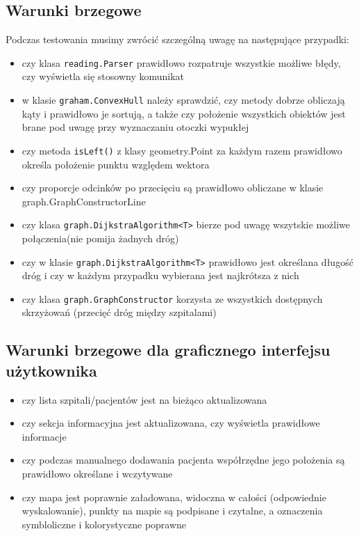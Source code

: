 \documentclass{article}
\begin{document}
\subsection{Warunki brzegowe}
Podczas testowania musimy zwrócić szczególną uwagę na następujące przypadki:

\begin{itemize}
    \item czy klasa \texttt{reading.Parser} prawidłowo rozpatruje wszystkie możliwe błędy, czy wyświetla się stosowny komunikat
    \item w klasie \texttt{graham.ConvexHull} należy sprawdzić, czy metody dobrze obliczają kąty i prawidłowo je sortują, a także czy położenie wszystkich obiektów jest brane pod uwagę przy wyznaczaniu otoczki wypukłej
    \item  czy metoda \texttt{isLeft()} z klasy geometry.Point za każdym razem prawidłowo określa położenie punktu względem wektora
    \item czy proporcje odcinków po przecięciu są prawidłowo obliczane w klasie graph.GraphConstructorLine
     \item czy klasa \texttt{graph.DijkstraAlgorithm<T>} bierze pod uwagę wszytskie możliwe połączenia(nie pomija żadnych dróg)
    \item czy w klasie \texttt{graph.DijkstraAlgorithm<T>} prawidłowo jest określana długość dróg i czy w każdym przypadku wybierana jest najkrótsza z nich
    \item czy klasa \texttt{graph.GraphConstructor} korzysta ze wszystkich dostępnych skrzyżowań  (przecięć dróg między szpitalami)
\end{itemize}

\subsection{Warunki brzegowe dla graficznego interfejsu użytkownika}
\begin{itemize}
    \item czy lista szpitali/pacjentów jest na bieżąco aktualizowana
    \item czy sekcja informacyjna jest aktualizowana, czy wyświetla prawidłowe informacje
    \item czy podczas manualnego dodawania pacjenta współrzędne jego położenia są prawidłowo określane i wczytywane
    \item czy mapa jest poprawnie załadowana, widoczna w całości (odpowiednie wyskalowanie), punkty na mapie są podpisane i czytalne, a oznaczenia symbloliczne i kolorystyczne poprawne
\end{itemize}
\end{document}
